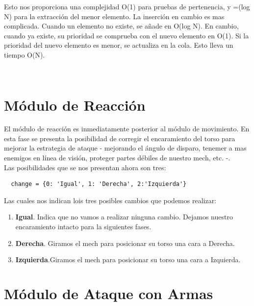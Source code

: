 \documentclass[a4paper,12pt,oneside]{book}
\begin{document}
Esto nos proporciona una complejidad O(1) para pruebas de pertenencia,
y =(log N) para la extracción del menor elemento. La inserción en
cambio es mas complicada. Cuando un elemento no existe, se añade en
O(log N). En cambio, cuando ya existe, su prioridad se comprueba con
el nuevo elemento en O(1). Si la prioridad del nuevo elemento es
menor, se actualiza en la cola. Esto lleva un tiempo O(N).

\

\section{Módulo de Reacción}

El módulo de reacción es inmediatamente posterior al módulo de
movimiento. En esta fase se presenta la posibilidad de corregir el
encaramiento del torso para mejorar la estrategia de ataque -
mejorando el ángulo de disparo, tenemer a mas enemigos en línea de
visión, proteger partes débiles de nuestro mech, etc. -.\\

Las posibilidades que se nos presentan ahora son tres:
\begin{lstlisting}
  change = {0: 'Igual', 1: 'Derecha', 2:'Izquierda'}
\end{lstlisting}
Las cuales nos indican lois tres posibles cambios que podemos
realizar:
\begin{enumerate}
\item {\bf Igual}. Indica que no vamos a realizar ninguna
  cambio. Dejamos nuestro encaramiento intacto para la siguientes
  fases.
\item {\bf Derecha}. Giramos el mech para posicionar su torso una cara
  a Derecha.
\item {\bf Izquierda}.Giramos el mech para posicionar su torso una cara
  a Izquierda.
\end{enumerate}


\section{Módulo de Ataque con Armas}
\end{document}
